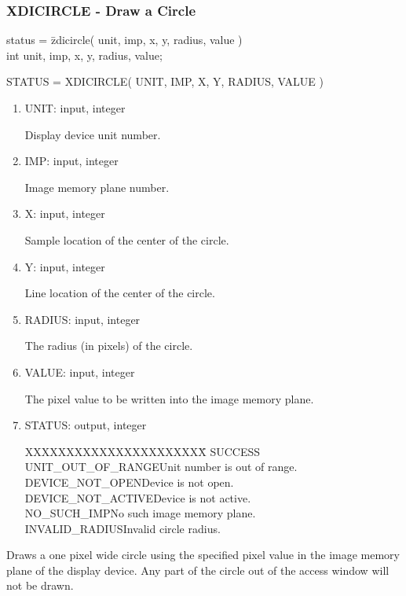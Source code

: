 \subsubsection{XDICIRCLE - Draw a Circle}
\begin{tabbing}
status = \=zdicircle( unit, imp, x, y, radius, value )\\
\>int  unit, imp, x, y, radius, value;\\
\end{tabbing}
STATUS = XDICIRCLE( UNIT, IMP, X, Y, RADIUS, VALUE )
\begin{enumerate}
\item UNIT:  input, integer

Display device unit number.
\item IMP:  input, integer

Image memory plane number.
\item X:  input, integer

Sample location of the center of the circle.
\item Y:  input, integer

Line location of the center of the circle.
\item RADIUS:  input, integer

The radius (in pixels) of the circle.
\item VALUE:  input, integer

The pixel value to be written into the image memory plane.
\item STATUS:  output, integer
\begin{tabbing}
XXXXXXXXXXXXXXXXXXXXXX\=\kill
SUCCESS\\
UNIT\_OUT\_OF\_RANGE\>Unit number is out of range.\\
DEVICE\_NOT\_OPEN\>Device is not open.\\
DEVICE\_NOT\_ACTIVE\>Device is not active.\\
NO\_SUCH\_IMP\>No such image memory plane.\\
INVALID\_RADIUS\>Invalid circle radius.\\
\end{tabbing}
\end{enumerate}
Draws a one pixel wide circle using the specified pixel value in the
image memory plane of the display device. Any part of the circle out of
the access window will not be drawn.
\newpage
